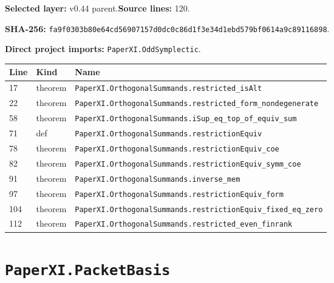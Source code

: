 \documentclass[10pt,oneside]{book}
\begin{document}
\textbf{Selected layer:} v0.44 parent.\quad\textbf{Source lines:} 120.\par\textbf{SHA-256:} {\scriptsize\nolinkurl{fa9f0303b80e64cd56907157d0dc0c86d1f3e34d1ebd579bf0614a9c89116898}}.


\textbf{Direct project imports:} \nolinkurl{PaperXI.OddSymplectic}.

\begin{longtable}{@{}p{}p{}p{}@{}}\toprule Line&Kind&Name\\\midrule\endhead

17&theorem&\nolinkurl{PaperXI.OrthogonalSummands.restricted_isAlt}\\

22&theorem&\nolinkurl{PaperXI.OrthogonalSummands.restricted_form_nondegenerate}\\

58&theorem&\nolinkurl{PaperXI.OrthogonalSummands.iSup_eq_top_of_equiv_sum}\\

71&def&\nolinkurl{PaperXI.OrthogonalSummands.restrictionEquiv}\\

78&theorem&\nolinkurl{PaperXI.OrthogonalSummands.restrictionEquiv_coe}\\

82&theorem&\nolinkurl{PaperXI.OrthogonalSummands.restrictionEquiv_symm_coe}\\

91&theorem&\nolinkurl{PaperXI.OrthogonalSummands.inverse_mem}\\

97&theorem&\nolinkurl{PaperXI.OrthogonalSummands.restrictionEquiv_form}\\

104&theorem&\nolinkurl{PaperXI.OrthogonalSummands.restrictionEquiv_fixed_eq_zero}\\

112&theorem&\nolinkurl{PaperXI.OrthogonalSummands.restricted_even_finrank}\\

\bottomrule\end{longtable}

\section{\texorpdfstring{\nolinkurl{PaperXI.PacketBasis}}{PaperXI.PacketBasis}}\label{module:PaperXI.PacketBasis}
\end{document}
